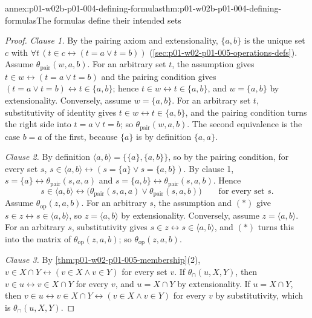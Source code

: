 \begin{annexitem}{annex:p01-w02b-p01-004-defining-formulas}{thm:p01-w02b-p01-004-defining-formulas}{The formulas define their intended sets}
\begin{proof}
\emph{Clause 1.} By the pairing axiom and extensionality, \(\{a,b\}\) is the
unique set \(c\) with \(\forall t\,(t\in c\leftrightarrow(t=a\lor t=b))\)
(\cref{sec:p01-w02-p01-005-operations-defs}). Assume
\(\theta_{\mathrm{pair}}(w,a,b)\). For an arbitrary set \(t\), the assumption
gives \(t\in w\leftrightarrow(t=a\lor t=b)\) and the pairing condition gives
\((t=a\lor t=b)\leftrightarrow t\in\{a,b\}\); hence
\(t\in w\leftrightarrow t\in\{a,b\}\), and \(w=\{a,b\}\) by extensionality.
Conversely, assume \(w=\{a,b\}\). For an arbitrary set \(t\), substitutivity
of identity gives \(t\in w\leftrightarrow t\in\{a,b\}\), and the pairing
condition turns the right side into \(t=a\lor t=b\); so
\(\theta_{\mathrm{pair}}(w,a,b)\). The second equivalence is the case \(b=a\)
of the first, because \(\{a\}\) is by definition \(\{a,a\}\).

\emph{Clause 2.} By definition \(\langle a,b\rangle=\{\{a\},\{a,b\}\}\), so by
the pairing condition, for every set \(s\),
\(s\in\langle a,b\rangle\leftrightarrow(s=\{a\}\lor s=\{a,b\})\). By clause 1,
\(s=\{a\}\leftrightarrow\theta_{\mathrm{pair}}(s,a,a)\) and
\(s=\{a,b\}\leftrightarrow\theta_{\mathrm{pair}}(s,a,b)\). Hence
\begin{equation}
  s\in\langle a,b\rangle\leftrightarrow
  \bigl(\theta_{\mathrm{pair}}(s,a,a)\lor\theta_{\mathrm{pair}}(s,a,b)\bigr)
  \qquad\text{for every set }s.
  \tag{\(\ast\)}
\end{equation}
Assume \(\theta_{\mathrm{op}}(z,a,b)\). For an arbitrary \(s\), the
assumption and \((\ast)\) give \(s\in z\leftrightarrow s\in\langle a,b\rangle\),
so \(z=\langle a,b\rangle\) by extensionality. Conversely, assume
\(z=\langle a,b\rangle\). For an arbitrary \(s\), substitutivity gives
\(s\in z\leftrightarrow s\in\langle a,b\rangle\), and \((\ast)\) turns this into
the matrix of \(\theta_{\mathrm{op}}(z,a,b)\); so
\(\theta_{\mathrm{op}}(z,a,b)\).

\emph{Clause 3.} By \cref{thm:p01-w02-p01-005-membership}(2),
\(v\in X\cap Y\leftrightarrow(v\in X\land v\in Y)\) for every set \(v\). If
\(\theta_{\cap}(u,X,Y)\), then \(v\in u\leftrightarrow v\in X\cap Y\) for every
\(v\), and \(u=X\cap Y\) by extensionality. If \(u=X\cap Y\), then
\(v\in u\leftrightarrow v\in X\cap Y\leftrightarrow(v\in X\land v\in Y)\) for
every \(v\) by substitutivity, which is \(\theta_{\cap}(u,X,Y)\).


\end{proof}
\end{annexitem}
